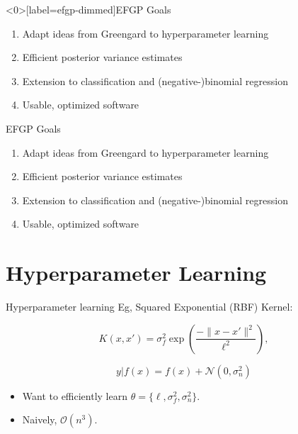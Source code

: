 \documentclass[aspectratio=169,xcolor=dvipsnames]{beamer}
\begin{document}
\newcommand{\EFGPList}{%
  \begin{enumerate}
    \item Adapt ideas from Greengard to hyperparameter learning
    \item Efficient posterior variance estimates
    \item Extension to classification and (negative-)binomial regression
    \item Usable, optimized software
  \end{enumerate}%
}

\begin{frame}<0>[label=efgp‐dimmed]{EFGP Goals}
  \begin{enumerate}
    \item<1-4>   Adapt ideas from Greengard to hyperparameter learning
    \item<2-4> Efficient posterior variance estimates
    \item<3-4> Extension to classification and (negative-)binomial regression
    \item<4>   Usable, optimized software
  \end{enumerate}
\end{frame}
\begin{frame}{EFGP Goals}
  \EFGPList
\end{frame}


\section{Hyperparameter Learning}
\begin{frame}{Hyperparameter learning}
Eg, Squared Exponential (RBF) Kernel:

$$K(x,x') = \sigma^2_f\exp(\frac{-\|x-x'\|^2}{\ell^2}),$$

$$y|f(x) = f(x) + \mathcal N(0,\sigma^2_n)$$

\begin{itemize}\item Want to efficiently learn $\theta = \{\ell, \sigma^2_f, \sigma^2_n\}.$ \item Naively, $\mathcal O(n^3)$.
\end{itemize}
    
\end{frame}
\end{document}
